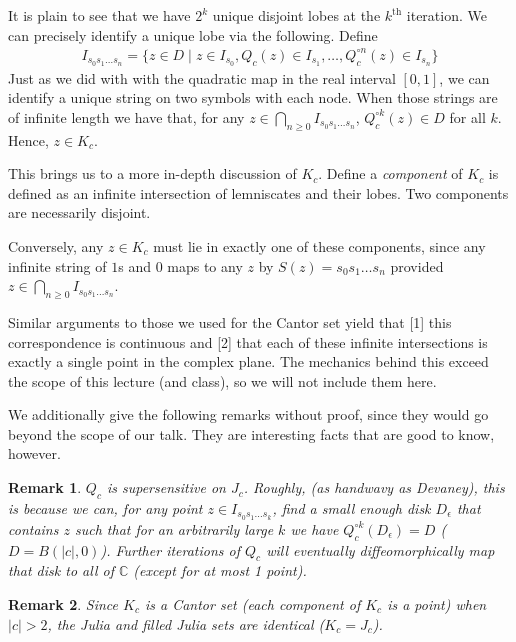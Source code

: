 \documentclass[symmetric]{tufte-handout}
\newtheorem{rmk}{Remark}
\begin{document}
It is plain to see that we have $2^k$ unique disjoint lobes at the $k^{\text{th}}$ iteration. We can precisely 
identify a unique lobe via the following. Define 
\begin{align*}
I_{s_0s_1\ldots s_n} = \{z\in D \; | \;  z \in I_{s_0}, Q_c(z) \in I_{s_1}, \ldots, Q_c^{\circ n}(z) \in I_{s_n}\}
\end{align*}
Just as we did with with the quadratic map in the real interval $[0,1]$, we can identify a unique string on two
symbols with each node. When those strings are of infinite length we have that, 
for any $z \in \bigcap_{n\ge 0} I_{s_0s_1\ldots s_n}$, $Q_c^{\circ k} (z) \in D$ for all $k$. Hence, $z \in K_c$. 

This brings us to a more in-depth discussion of $K_c$.
Define a \textsl{component} of $K_c$ is defined as an infinite 
intersection of lemniscates and their lobes. Two components are necessarily disjoint.

Conversely, any $z \in K_c$ must lie in exactly one of these components, since any infinite string of $1$s and $0$
maps to any $z$ by $S(z) = s_0s_1\ldots s_n$ provided $z\in \bigcap_{n\ge 0} I_{s_0s_1 \ldots s_n}$.

Similar arguments to those we used for the Cantor set yield that [1] this correspondence is continuous and [2] that each of these infinite intersections is exactly a single point in the complex plane. The mechanics behind this exceed the scope of this lecture (and class), so we will not include them here.


We additionally give the following remarks without proof, since they would go beyond the scope of our talk. 
They are interesting facts that are good to know, however.


\begin{rmk}
$Q_c$ is supersensitive on $J_c$. Roughly, (as handwavy as Devaney), this is because we can, for any point $z \in I_{s_0s_1\ldots s_k}$, find a small enough disk $D_{\epsilon}$ that contains $z$ such that for an arbitrarily large $k$ we have $Q_c^{\circ k}(D_{\epsilon}) = D$ ($D = B(|c|,0)$). Further iterations of $Q_c$ will eventually diffeomorphically map that disk to 
all of $\mathbb{C}$ (except for at most 1 point).
\end{rmk}


\begin{rmk}
Since $K_c$ is a Cantor set (each component of $K_c$ is a point) when $|c| > 2$, the Julia and filled Julia sets are identical ($K_c = J_c$).
\end{rmk}
\end{document}

